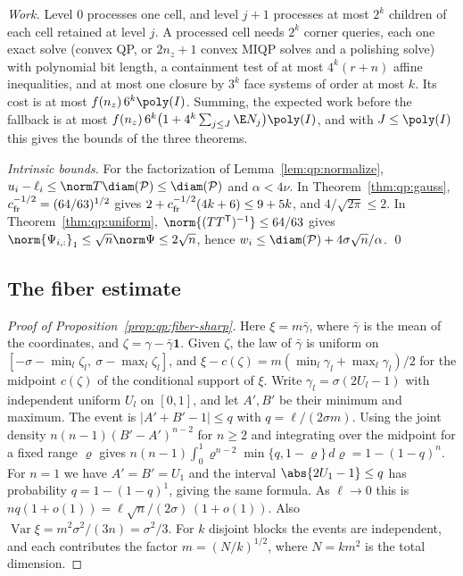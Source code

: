 \emph{Work.} Level $0$ processes one cell, and level $j+1$ processes at most
$2^k$ children of each cell retained at level $j$. A processed cell needs $2^k$
corner queries, each one exact solve (convex QP, or $2n_z+1$ convex MIQP solves
and a polishing solve) with polynomial bit length, a containment test of at
most $4^k(r+n)$ affine inequalities, and at most one closure by $3^k$ face
systems of order at most $k$. Its cost is at most
$f(n_z)\,6^k\poly(I)$. Summing, the expected work before the fallback is at
most $f(n_z)\,6^k\bigl(1+4^k\sum_{j\le J}\E N_j\bigr)\poly(I)$, and with
$J\le\poly(I)$ this gives the bounds of the three theorems.

\emph{Intrinsic bounds.} For the factorization of Lemma~\ref{lem:qp:normalize},
$u_i-\ell_i\le\norm T\diam(\mathcal P)\le\diam(\mathcal P)$ and $\alpha<4\nu$.
In Theorem~\ref{thm:qp:gauss}, $c_{\rm fr}^{-1/2}=(64/63)^{1/2}$ gives
$2+c_{\rm fr}^{-1/2}(4k+6)\le9+5k$, and $4/\sqrt{2\pi}\le2$. In
Theorem~\ref{thm:qp:uniform}, $\norm{(TT^{\mathsf T})^{-1}}\le64/63$ gives
$\norm{\Psi_{i,:}}_1\le\sqrt n\norm\Psi\le2\sqrt n$, hence
$w_i\le\diam(\mathcal P)+4\sigma\sqrt n/\alpha$. \qed

\subsection{The fiber estimate}

\begin{proof}[Proof of Proposition~\ref{prop:qp:fiber-sharp}]
Here $\xi=m\bar\gamma$, where $\bar\gamma$ is the mean of the coordinates, and
$\zeta=\gamma-\bar\gamma\mathbf1$. Given $\zeta$, the law of $\bar\gamma$ is
uniform on $[-\sigma-\min_l\zeta_l,\ \sigma-\max_l\zeta_l]$, and
$\xi-c(\zeta)=m(\min_l\gamma_l+\max_l\gamma_l)/2$ for the midpoint $c(\zeta)$
of the conditional support of $\xi$. Write $\gamma_l=\sigma(2U_l-1)$ with
independent uniform $U_l$ on $[0,1]$, and let $A',B'$ be their minimum and
maximum. The event is $|A'+B'-1|\le q$ with $q=\ell/(2\sigma m)$. Using the
joint density $n(n-1)(B'-A')^{n-2}$ for $n\ge2$ and integrating over the midpoint for a
fixed range $\varrho$ gives
$n(n-1)\int_0^1\varrho^{n-2}\min\{q,1-\varrho\}\,d\varrho=1-(1-q)^n$.
For $n=1$ we have $A'=B'=U_1$ and the interval
$\abs{2U_1-1}\le q$ has probability $q=1-(1-q)^1$, giving the same formula. As
$\ell\to0$ this is $nq(1+o(1))=\ell\sqrt n/(2\sigma)\,(1+o(1))$. Also
$\operatorname{Var}\xi=m^2\sigma^2/(3n)=\sigma^2/3$. For $k$ disjoint blocks the
events are independent, and each contributes the factor $m=(N/k)^{1/2}$, where
$N=km^2$ is the total dimension.
\end{proof}

